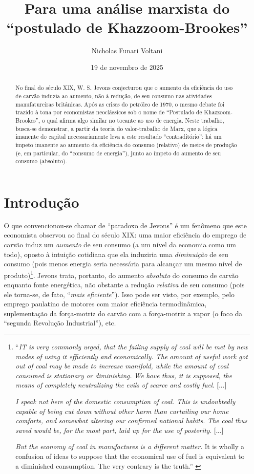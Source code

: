 \documentclass{article}[12pt]
\title{Para uma análise marxista do ``postulado de Khazzoom-Brookes''}
\author{Nicholas Funari Voltani}
\date{19 de novembro de 2025}
\begin{document}
\maketitle


\begin{abstract}
    No final do século XIX, W. S. Jevons conjecturou que o aumento da eficiência do uso de carvão induzia ao aumento, não à redução, de seu consumo nas atividades manufatureiras britânicas. Após as crises do petróleo de 1970, o mesmo debate foi trazido à tona por economistas neoclássicos sob o nome de ``Postulado de Khazzoom-Brookes'', o qual afirma algo similar no tocante ao uso de energia. Neste trabalho, busca-se demonstrar, a partir da teoria do valor-trabalho de Marx, que a lógica imanente do capital necessariamente leva a este resultado ``contraditório'': há um ímpeto imanente ao aumento da eficiência do consumo (relativo) de meios de produção (e, em particular, do ``consumo de energia''), junto ao ímpeto do aumento de seu consumo (absoluto).
\end{abstract}


\section{Introdução}
O que convencionou-se chamar de ``paradoxo de Jevons'' é um fenômeno que este economista observou ao final do século XIX: uma maior eficiência do emprego de carvão induz um \textit{aumento} de seu consumo (a um nível da economia como um todo), oposto à intuição cotidiana que ela induziria uma \textit{diminuição} de seu consumo (pois menos energia seria necessária para alcançar um mesmo nível de produto)\footnote{``\textit{IT is very commonly urged, that the failing supply of coal will be met by new modes of using it efficiently and economically. The amount of useful work got out of coal may be made to increase manifold, while the amount of coal consumed is stationary or diminishing. We have thus, it is supposed, the means of completely neutralizing the evils of scarce and costly fuel.} [...]

    \textit{I speak not here of the domestic consumption of coal. This is undoubtedly capable of being cut down without other harm than curtailing our home comforts, and somewhat altering our confirmed national habits. The coal thus saved would be, for the most part, laid up for the use of posterity.} [...]
    
    \textit{But the economy of coal in manufactures is a different matter.} It is wholly a confusion of ideas to suppose that the economical use of fuel is equivalent to a diminished consumption. The very contrary is the truth.'' \cite[p. 75; grifo meu]{Jevons1866}}. 
Jevons trata, portanto, do aumento \textit{absoluto} do consumo de carvão enquanto fonte energética, não obstante a redução \textit{relativa} de seu consumo (pois ele torna-se, de fato, ``\textit{mais eficiente}''). Isso pode ser visto, por exemplo, pelo emprego paulatino de motores com maior eficiência termodinâmica, suplementação da força-motriz do carvão com a força-motriz a vapor (o foco da ``segunda Revolução Industrial''), etc. 
\end{document}
